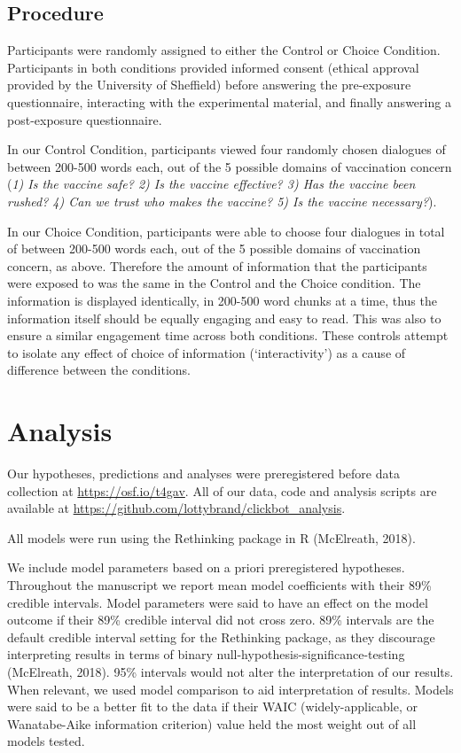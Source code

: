 \documentclass[
  english,
  ,jou,floatsintext]{apa6}
\begin{document}
\hypertarget{procedure}{%
\subsection{Procedure}\label{procedure}}

Participants were randomly assigned to either the Control or Choice Condition. Participants in both conditions provided informed consent (ethical approval provided by the University of Sheffield) before answering the pre-exposure questionnaire, interacting with the experimental material, and finally answering a post-exposure questionnaire.

In our Control Condition, participants viewed four randomly chosen dialogues of between 200-500 words each, out of the 5 possible domains of vaccination concern (\emph{1) Is the vaccine safe? 2) Is the vaccine effective? 3) Has the vaccine been rushed? 4) Can we trust who makes the vaccine? 5) Is the vaccine necessary?}).

In our Choice Condition, participants were able to choose four dialogues in total of between 200-500 words each, out of the 5 possible domains of vaccination concern, as above. Therefore the amount of information that the participants were exposed to was the same in the Control and the Choice condition. The information is displayed identically, in 200-500 word chunks at a time, thus the information itself should be equally engaging and easy to read. This was also to ensure a similar engagement time across both conditions. These controls attempt to isolate any effect of choice of information (`interactivity') as a cause of difference between the conditions.

\hypertarget{analysis}{%
\section{Analysis}\label{analysis}}

Our hypotheses, predictions and analyses were preregistered before data collection at \url{https://osf.io/t4gav}. All of our data, code and analysis scripts are available at \url{https://github.com/lottybrand/clickbot_analysis}.

All models were run using the Rethinking package in R (McElreath, 2018).

We include model parameters based on a priori preregistered hypotheses. Throughout the manuscript we report mean model coefficients with their 89\% credible intervals. Model parameters were said to have an effect on the model outcome if their 89\% credible interval did not cross zero. 89\% intervals are the default credible interval setting for the Rethinking package, as they discourage interpreting results in terms of binary null-hypothesis-significance-testing (McElreath, 2018). 95\% intervals would not alter the interpretation of our results. When relevant, we used model comparison to aid interpretation of results. Models were said to be a better fit to the data if their WAIC (widely-applicable, or Wanatabe-Aike information criterion) value held the most weight out of all models tested.
\end{document}
